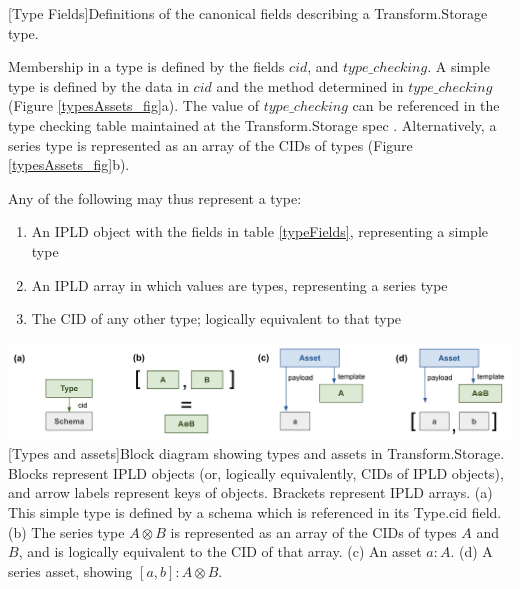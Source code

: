 \documentclass[9pt, oneside]{article}   	%
\begin{document}
\begin{multicols}{2}
[Type Fields]{Definitions of the canonical fields describing a Transform.Storage type.}
\label{typeFields}
\setlength{\parindent}{.5 cm}
\vspace{.25 cm}

Membership in a type is defined by the fields $cid$, and $type\_checking$. A simple type is defined by the data in $cid$ and the method determined in $type\_checking$ (Figure \ref{typesAssets_fig}a). The value of $type\_checking$ can be referenced in the type checking table maintained at the Transform.Storage spec \cite{transformSpec}. Alternatively, a series type is represented as an array of the CIDs of types (Figure \ref{typesAssets_fig}b). 

Any of the following may thus represent a type:
\begin{enumerate}
\item An IPLD object with the fields in table \ref{typeFields}, representing a simple type
\item An IPLD array in which values are types, representing a series type
\item The CID of any other type; logically equivalent to that type
\end{enumerate}

\end{multicols}
\begin{center}
\includegraphics[width=1\columnwidth]{fig_types_assets_20230802}
[Types and assets]{Block diagram showing types and assets in Transform.Storage. Blocks represent IPLD objects (or, logically equivalently, CIDs of IPLD objects), and arrow labels represent keys of objects. Brackets represent IPLD arrays. (a) This simple type is defined by a schema which is referenced in its Type.cid field. (b) The series type $A \otimes B$ is represented as an array of the CIDs of types $A$ and $B$, and is logically equivalent to the CID of that array. (c) An asset $a : A$. (d) A series asset, showing $[a, b] : A \otimes B$.}
\label{typesAssets_fig}
\end{center}
\end{document}
